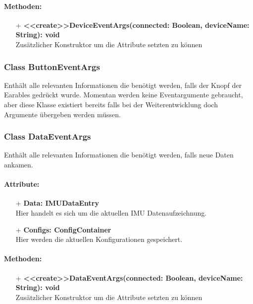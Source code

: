 \documentclass[a4paper,12pt]{article}
\begin{document}
\paragraph{Methoden:}
\begin{itemize}
	\item[+] \textbf{<<create>>DeviceEventArgs(connected: Boolean, deviceName: String): void}\\Zusätzlicher Konstruktor um die Attribute setzten zu können
\end{itemize}


\subsubsection{Class ButtonEventArgs}
Enthält alle relevanten Informationen die benötigt werden, falls der Knopf der Earables gedrückt wurde. Momentan werden keine Eventargumente gebraucht, aber diese Klasse existiert bereits falls bei der Weiterentwicklung doch Argumente übergeben werden müssen.


\subsubsection{Class DataEventArgs}
Enthält alle relevanten Informationen die benötigt werden, falls neue Daten ankamen.

\paragraph{Attribute:}
\begin{itemize}
	\item[+] \textbf{Data: IMUDataEntry}\\Hier handelt es sich um die aktuellen IMU Datenaufzeichnung.
	\item[+] \textbf{Configs: ConfigContainer}\\Hier werden die aktuellen Konfigurationen gespeichert.
\end{itemize}

\paragraph{Methoden:}
\begin{itemize}
	\item[+] \textbf{<<create>>DataEventArgs(connected: Boolean, deviceName: String): void}\\Zusätzlicher Konstruktor um die Attribute setzten zu können
\end{itemize}
\end{document}

